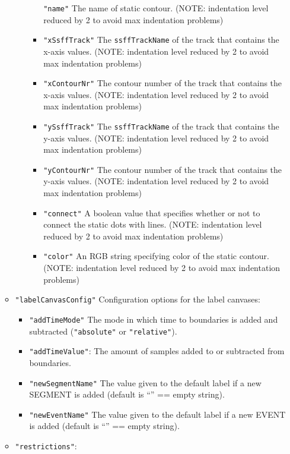 \documentclass[]{book}
\theoremstyle{definition}
\theoremstyle{definition}
\theoremstyle{definition}
\theoremstyle{remark}
\begin{document}
\begin{itemize}
\begin{itemize}
\begin{itemize}
\begin{itemize}
        \texttt{"name"} The name of static contour. (NOTE: indentation
        level reduced by 2 to avoid max indentation problems)
      \item
        \texttt{"xSsffTrack"} The \texttt{ssffTrackName} of the track
        that contains the x-axis values. (NOTE: indentation level
        reduced by 2 to avoid max indentation problems)
      \item
        \texttt{"xContourNr"} The contour number of the track that
        contains the x-axis values. (NOTE: indentation level reduced by
        2 to avoid max indentation problems)
      \item
        \texttt{"ySsffTrack"} The \texttt{ssffTrackName} of the track
        that contains the y-axis values. (NOTE: indentation level
        reduced by 2 to avoid max indentation problems)
      \item
        \texttt{"yContourNr"} The contour number of the track that
        contains the y-axis values. (NOTE: indentation level reduced by
        2 to avoid max indentation problems)
      \item
        \texttt{"connect"} A boolean value that specifies whether or not
        to connect the static dots with lines. (NOTE: indentation level
        reduced by 2 to avoid max indentation problems)
      \item
        \texttt{"color"} An RGB string specifying color of the static
        contour. (NOTE: indentation level reduced by 2 to avoid max
        indentation problems)
      \end{itemize}
    \end{itemize}
  \item
    \texttt{"labelCanvasConfig"} Configuration options for the label
    canvases:

    \begin{itemize}
    \item
      \texttt{"addTimeMode"} The mode in which time to boundaries is
      added and subtracted (\texttt{"absolute"} or \texttt{"relative"}).
    \item
      \texttt{"addTimeValue"}: The amount of samples added to or
      subtracted from boundaries.
    \item
      \texttt{"newSegmentName"} The value given to the default label if
      a new SEGMENT is added (default is ``'' == empty string).
    \item
      \texttt{"newEventName"} The value given to the default label if a
      new EVENT is added (default is ``'' == empty string).
    \end{itemize}
  \item
    \texttt{"restrictions"}:


\end{itemize}
\end{itemize}
\end{document}
